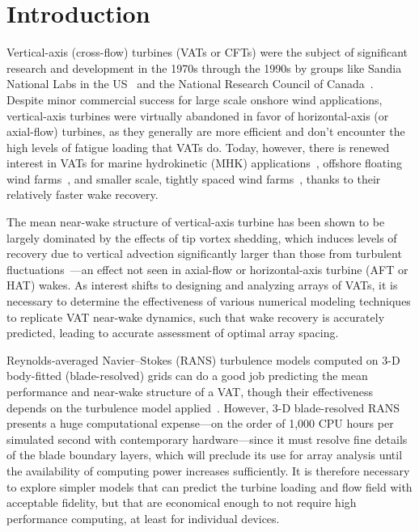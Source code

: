 \documentclass[times]{weauth}
\begin{document}

\maketitle

\printnomenclature

\section{Introduction}

Vertical-axis (cross-flow) turbines (VATs or CFTs) were the subject of
significant research and development in the 1970s through the 1990s by groups
like Sandia National Labs in the US~\cite{Sutherland2012} and the National
Research Council of Canada~\cite{Para2002}. Despite minor commercial success for
large scale onshore wind applications, vertical-axis turbines were virtually
abandoned in favor of horizontal-axis (or axial-flow) turbines, as they
generally are more efficient and don't encounter the high levels of fatigue
loading that VATs do. Today, however, there is renewed interest in VATs for
marine hydrokinetic (MHK) applications~\cite{ORPC2012}, offshore floating wind
farms~\cite{Paulsen2011, Sandia2012, Dodd2014}, and smaller scale, tightly
spaced wind farms~\cite{Dabiri2011, Kinzel2012}, thanks to their relatively
faster wake recovery.


The mean near-wake structure of vertical-axis turbine has been shown to be
largely dominated by the effects of tip vortex shedding, which induces levels of
recovery due to vertical advection significantly larger than those from
turbulent fluctuations~\cite{Bachant2015-JoT}---an effect not seen in axial-flow
or horizontal-axis turbine (AFT or HAT) wakes. As interest shifts to designing
and analyzing arrays of VATs, it is necessary to determine the effectiveness of
various numerical modeling techniques to replicate VAT near-wake dynamics, such
that wake recovery is accurately predicted, leading to accurate assessment of
optimal array spacing.

Reynolds-averaged Navier--Stokes (RANS) turbulence models computed on 3-D
body-fitted (blade-resolved) grids can do a good job predicting the mean
performance and near-wake structure of a VAT, though their effectiveness depends
on the turbulence model
applied~\cite{Bachant2016-BR-CFD,Lam2016,Alaimo2015,Boudreau2015,Marsh2015}.
However, 3-D blade-resolved RANS presents a huge computational expense---on the
order of 1,000 CPU hours per simulated second with contemporary hardware---since
it must resolve fine details of the blade boundary layers, which will preclude
its use for array analysis until the availability of computing power increases
sufficiently. It is therefore necessary to explore simpler models that can
predict the turbine loading and flow field with acceptable fidelity, but that
are economical enough to not require high performance computing, at least for
individual devices.
\end{document}
